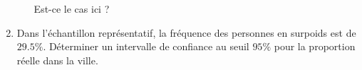 \begin{exercice}
\begin{enumerate}
\begin{enumerate}
                    Est-ce le cas ici ?
            \end{enumerate}
        \item
            Dans l'échantillon représentatif, la fréquence des personnes en surpoids est de \( 29.5\%\). Déterminer un intervalle de confiance au seuil \( 95\%\) pour la proportion réelle dans la ville.
            
    \end{enumerate}
    
\end{exercice}
